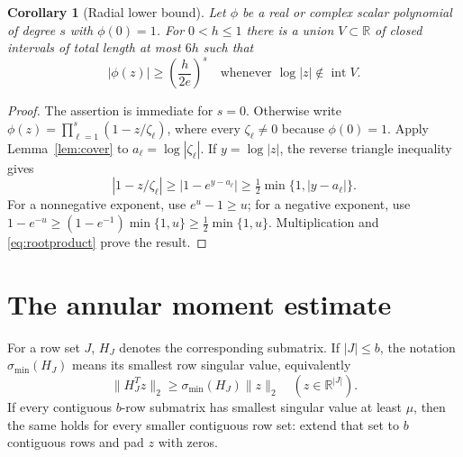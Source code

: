 \documentclass[11pt]{article}
\numberwithin{equation}{section}
\newtheorem{corollary}[theorem]{Corollary}
\theoremstyle{definition}
\newcommand{\R}{\mathbb R}
\newcommand{\sm}{\sigma_{\min}}
\newcommand{\nn}[1]{\lVert #1\rVert}
\begin{document}
\begin{corollary}[Radial lower bound]\label{cor:radial}
Let $\phi$ be a real or complex scalar polynomial of degree $s$ with $\phi(0)=1$. For $0<h\le1$ there is a union $V\subset\R$ of closed intervals of total length at most $6h$ such that
\begin{equation}\label{eq:radial}
|\phi(z)|\ge\left(\frac{h}{2e}\right)^s
\quad\text{whenever }\log|z|\notin\operatorname{int}V.
\end{equation}
\end{corollary}
\begin{proof}
The assertion is immediate for $s=0$. Otherwise write
$\phi(z)=\prod_{\ell=1}^s(1-z/\zeta_\ell)$, where every $\zeta_\ell\ne0$ because $\phi(0)=1$. Apply Lemma~\ref{lem:cover} to $a_\ell=\log|\zeta_\ell|$. If $y=\log|z|$, the reverse triangle inequality gives
\[
|1-z/\zeta_\ell|\ge|1-e^{y-a_\ell}|
\ge\tfrac12\min\{1,|y-a_\ell|\}.
\]
For a nonnegative exponent, use $e^u-1\ge u$; for a negative exponent, use
$1-e^{-u}\ge(1-e^{-1})\min\{1,u\}\ge\tfrac12\min\{1,u\}$.
Multiplication and \eqref{eq:rootproduct} prove the result.
\end{proof}

\section{The annular moment estimate}\label{sec:annular}
For a row set $J$, $H_J$ denotes the corresponding submatrix. If $|J|\le b$, the notation $\sm(H_J)$ means its smallest row singular value, equivalently
\[
\nn{H_J^Tz}_2\ge\sm(H_J)\nn z_2\quad(z\in\R^{|J|}).
\]
If every contiguous $b$-row submatrix has smallest singular value at least $\mu$, then the same holds for every smaller contiguous row set: extend that set to $b$ contiguous rows and pad $z$ with zeros.
\end{document}
